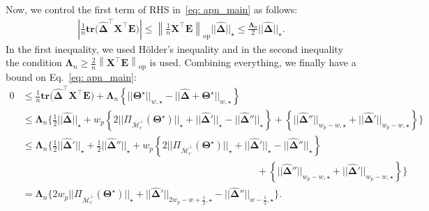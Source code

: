\documentclass[12pt]{article}
\begin{document}
Now, we control the first term of RHS in~\eqref{eq: apn_main} as follows:
\begin{align} 
    \left| \frac{1}{n} \textbf{tr}\big( \boldsymbol{\widehat{\Delta}}^{\top} \boldsymbol{X}^{\top}\boldsymbol{E} \big) \right| 
    \leq \left\|\frac{1}{n} \boldsymbol{X}^{\top}\boldsymbol{E} \right\|_{\text{op}} ||\boldsymbol{\widehat{\Delta}}||_{\star}
    \leq \frac{\boldsymbol{\Lambda}_{n}}{2} ||\boldsymbol{\widehat{\Delta}}||_{\star}.
    \label{holder_ineq}
\end{align}
In the first inequality, we used H\"older's inequality and in the second inequality 
the condition $\boldsymbol{\Lambda}_{n}\geq\frac{2}{n}\left\|\boldsymbol{X}^{\top}\boldsymbol{E} \right\|_{\text{op}}$ is used.
Combining everything, we finally have a bound on Eq.~\eqref{eq: apn_main}:
\begin{align}
    0  & \leq \frac{1}{n} \textbf{tr}\big( \boldsymbol{\widehat{\Delta}}^{\top} \boldsymbol{X}^{\top}\boldsymbol{E} \big)
    + \boldsymbol{\Lambda}_{n}\left\lbrace||\boldsymbol{\Theta^{\star}}||_{w, \star} - ||\boldsymbol{\widehat{\Delta}} + \boldsymbol{\Theta^{\star}}||_{w, \star}\right\rbrace \nonumber\\
    & \leq \boldsymbol{\Lambda}_{n} \Bigg\{ \frac{1}{2}||\boldsymbol{\widehat{\Delta}}||_{\star} + w_{p}\left\lbrace 2||\Pi_{\overline{\mathcal{M}}_{r}^{\perp}}(\boldsymbol{\Theta^{\star}})||_{\star} + ||\boldsymbol{\widehat{\Delta}}'||_{\star} - ||\boldsymbol{\widehat{\Delta}}''||_{\star}  \right\rbrace + \left\lbrace ||\boldsymbol{\widehat{\Delta}}''||_{w_{p} - w, \star}  + ||\boldsymbol{\widehat{\Delta}}'||_{w_{p} - w, \star}\right\rbrace \Bigg\} \nonumber\\
    & \leq \boldsymbol{\Lambda}_{n} \Bigg\{ \frac{1}{2}||\boldsymbol{\widehat{\Delta}}'||_{\star} + \frac{1}{2}||\boldsymbol{\widehat{\Delta}}''||_{\star} + w_{p}\left\lbrace 2||\Pi_{\overline{\mathcal{M}}_{r}^{\perp}}(\boldsymbol{\Theta^{\star}})||_{\star} + ||\boldsymbol{\widehat{\Delta}}'||_{\star} - ||\boldsymbol{\widehat{\Delta}}''||_{\star}  \right\rbrace \\
    & \qquad \qquad \qquad \qquad \qquad 
    \qquad \qquad \qquad \qquad \qquad 
    \qquad \qquad + \left\lbrace ||\boldsymbol{\widehat{\Delta}}''||_{w_{p} - w, \star}  + ||\boldsymbol{\widehat{\Delta}}'||_{w_{p} - w, \star}\right\rbrace \Bigg\} \nonumber\\
    &= \boldsymbol{\Lambda}_{n} \Bigg\{ 2w_{p}||\Pi_{\overline{\mathcal{M}}_{r}^{\perp}}(\boldsymbol{\Theta^{\star}})||_{\star} +  ||\boldsymbol{\widehat{\Delta}}'||_{2w_{p}-w+\frac{1}{2}, \star} - ||\boldsymbol{\widehat{\Delta}}''||_{w - \frac{1}{2},\star} \Bigg\}. \label{eq: pre_new_main}
\end{align}
\end{document}
